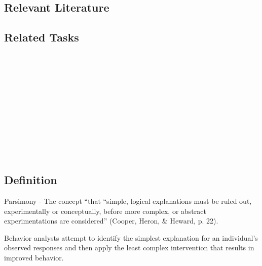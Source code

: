 \subsection{Relevant Literature}
\begin{refsection}
\nocite{test,alang2017police,clayton2018black}
\printbibliography[heading=none]
\end{refsection}
%
\subsection{Related Tasks}
\fourbOne{}\\
\fourhOne{}\\
\fourhThree{}\\
\fouriOne{}\\
\fouriThree{}\\
\fouriFive{}\\
\fourjOne{}\\
\fourjFifteen{}\\
\fourkSeven{}\\
\fourFKTen{}\\
%
%
%
%
%
\section{\fourFKFive{}}
\subsection{Definition}
Parsimony - The concept ``that ``simple, logical explanations must be ruled out, experimentally or conceptually, before more complex, or abstract experimentations are considered'' (Cooper, Heron, \& Heward, p. 22). 

Behavior analysts attempt to identify the simplest explanation for an individual's observed responses and then apply the least complex intervention that results in improved behavior. 
%

